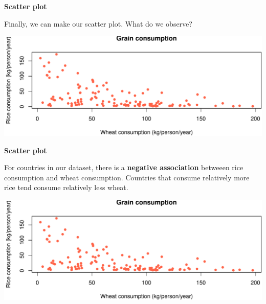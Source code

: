 \documentclass[ignorenonframetext,]{beamer}
\newenvironment{Shaded}{\begin{snugshade}}{\end{snugshade}}
\newcommand{\DataTypeTok}[1]{\textcolor[rgb]{0.13,0.29,0.53}{#1}}
\newcommand{\DecValTok}[1]{\textcolor[rgb]{0.00,0.00,0.81}{#1}}
\newcommand{\KeywordTok}[1]{\textcolor[rgb]{0.13,0.29,0.53}{\textbf{#1}}}
\newcommand{\NormalTok}[1]{#1}
\newcommand{\OperatorTok}[1]{\textcolor[rgb]{0.81,0.36,0.00}{\textbf{#1}}}
\newcommand{\StringTok}[1]{\textcolor[rgb]{0.31,0.60,0.02}{#1}}
\begin{document}
\begin{frame}[fragile]{}
\protect\hypertarget{section-21}{}

\textbf{\large Scatter plot}

Finally, we can make our scatter plot. What do we observe?

\vspace{1ex}\scriptsize

\begin{Shaded}
\end{Shaded}

\includegraphics{lecture-03_files/figure-beamer/unnamed-chunk-13-1.pdf}

\end{frame}

\begin{frame}{}
\protect\hypertarget{section-22}{}

\textbf{\large Scatter plot}

For countries in our dataset, there is a \textbf{negative association}
betweeen rice consumption and wheat consumption. Countries that consume
relatively more rice tend consume relatively less wheat.

\vspace{1ex}\scriptsize

\includegraphics{lecture-03_files/figure-beamer/unnamed-chunk-14-1.pdf}

\end{frame}
\end{document}
